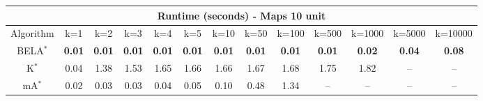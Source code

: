 \begin{tabular}{c|cccccccccccc}\toprule
\multicolumn{13}{c}{Runtime (seconds) - Maps 10 unit}\\ \midrule
Algorithm & k=1 & k=2 & k=3 & k=4 & k=5 & k=10 & k=50 & k=100 & k=500 & k=1000 & k=5000 & k=10000 \\ \midrule
BELA$^*$ & \textbf{0.01} & \textbf{0.01} & \textbf{0.01} & \textbf{0.01} & \textbf{0.01} & \textbf{0.01} & \textbf{0.01} & \textbf{0.01} & \textbf{0.01} & \textbf{0.02} & \textbf{0.04} & \textbf{0.08} \\
K$^*$ & 0.04 & 1.38 & 1.53 & 1.65 & 1.66 & 1.66 & 1.67 & 1.68 & 1.75 & 1.82 & -- & -- \\
mA$^*$ & 0.02 & 0.03 & 0.03 & 0.04 & 0.05 & 0.10 & 0.48 & 1.34 & -- & -- & -- & -- \\ \bottomrule 
\end{tabular}
